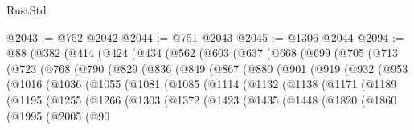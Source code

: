 \begin{lexlean}{RustStd}
\begin{coremodule}
@2043 := @752 @2042
@2044 := @751 @2043
@2045 := @1306 @2044
@2094 := @88
    (@382
      (@414
        (@424
          (@434
            (@562
              (@603
                (@637
                  (@668
                    (@699
                      (@705
                        (@713
                          (@723
                            (@768
                              (@790
                                (@829
                                  (@836
                                    (@849
                                      (@867
                                        (@880
                                          (@901
                                            (@919
                                              (@932
                                                (@953
                                                  (@1016
                                                    (@1036
                                                      (@1055
                                                        (@1081
                                                          (@1085
                                                            (@1114
                                                              (@1132
                                                                (@1138
                                                                  (@1171
                                                                    (@1189
                                                                      (@1195
                                                                        (@1255
                                                                          (@1266
                                                                            (@1303
                                                                              (@1372
                                                                                (@1423
                                                                                  (@1435
                                                                                    (@1448
                                                                                      (@1820
                                                                                        (@1860
                                                                                          (@1995
                                                                                            (@2005
                                                                                              (@90

\end{coremodule}
\end{lexlean}
